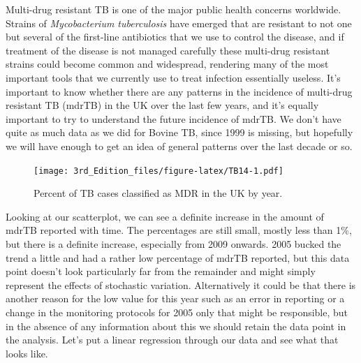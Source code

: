 \documentclass[
]{book}
\newenvironment{Shaded}{\begin{snugshade}}{\end{snugshade}}
\newcommand{\DataTypeTok}[1]{\textcolor[rgb]{0.13,0.29,0.53}{#1}}
\newcommand{\KeywordTok}[1]{\textcolor[rgb]{0.13,0.29,0.53}{\textbf{#1}}}
\newcommand{\NormalTok}[1]{#1}
\newcommand{\OperatorTok}[1]{\textcolor[rgb]{0.81,0.36,0.00}{\textbf{#1}}}
\newcommand{\StringTok}[1]{\textcolor[rgb]{0.31,0.60,0.02}{#1}}
\begin{document}
Multi-drug resistant TB is one of the major public health concerns worldwide. Strains of \emph{Mycobacterium tuberculosis} have emerged that are resistant to not one but several of the first-line antibiotics that we use to control the disease, and if treatment of the disease is not managed carefully these multi-drug resistant strains could become common and widespread, rendering many of the most important tools that we currently use to treat infection essentially useless. It's important to know whether there are any patterns in the incidence of multi-drug resistant TB (mdrTB) in the UK over the last few years, and it's equally important to try to understand the future incidence of mdrTB. We don't have quite as much data as we did for Bovine TB, since 1999 is missing, but hopefully we will have enough to get an idea of general patterns over the last decade or so.

\begin{Shaded}
\end{Shaded}

\begin{figure}
\centering
\texttt{[image: 3rd\_Edition\_files/figure-latex/TB14-1.pdf]}
\caption{\label{fig:TB14}Percent of TB cases classified as MDR in the UK by year.}
\end{figure}

Looking at our scatterplot, we can see a definite increase in the amount of mdrTB reported with time. The percentages are still small, mostly less than 1\%, but there is a definite increase, especially from 2009 onwards. 2005 bucked the trend a little and had a rather low percentage of mdrTB reported, but this data point doesn't look particularly far from the remainder and might simply represent the effects of stochastic variation. Alternatively it could be that there is another reason for the low value for this year such as an error in reporting or a change in the monitoring protocols for 2005 only that might be responsible, but in the absence of any information about this we should retain the data point in the analysis. Let's put a linear regression through our data and see what that looks like.
\end{document}

